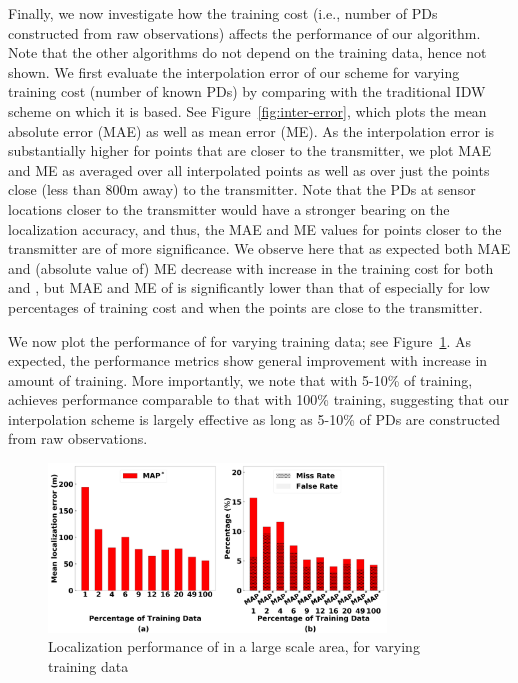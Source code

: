   Finally, we now investigate how the
training cost (i.e., number of PDs constructed from raw observations)
affects the performance of our \ouralgo algorithm. Note that the other
algorithms do not depend on the training data, hence not shown.
We first evaluate the interpolation error of our \ildw scheme for
varying training cost (number of known PDs) by comparing with the
traditional IDW scheme on which it is based. See
Figure~\ref{fig:inter-error}, which plots the mean absolute error
(MAE) as well as mean error (ME). As the interpolation error is
substantially higher for points that are closer to the transmitter, we
plot MAE and ME as averaged over all interpolated points as well as
over just the points close (less than 800m away) to the transmitter. Note
that the PDs at sensor locations closer to the transmitter would have
a stronger bearing on the localization accuracy, and thus, the MAE and
ME values for points closer to the transmitter are of more
significance.
We observe here that as expected both MAE and (absolute value of) ME
decrease with increase in the training cost for both \idw and \ildw,
but MAE and ME of \ildw is significantly lower than that of \idw
especially for low percentages of training cost and when the points
are close to the transmitter.

We now plot the performance of \ouralgo for varying training data; see
Figure~\ref{fig:varying-training-data}. As expected, the performance
metrics show general improvement with increase in amount of
training. More importantly, we note that with 5-10\% of training,
\ouralgo achieves performance comparable to that with 100\% training,
suggesting that our interpolation scheme is largely effective as long
as 5-10\% of PDs are constructed from raw observations. 



\begin{figure}[ht]
	\centering
	\includegraphics[width=0.8\textwidth]{chapters/ipsn/figures/splat-vary-training.png}
	\caption{Localization performance of \ouralgo in a large scale area, for varying training data}
	\label{fig:varying-training-data}
\end{figure}

